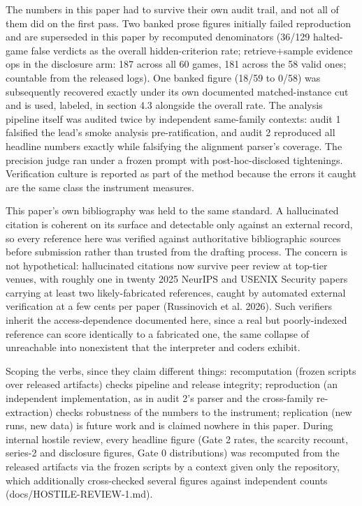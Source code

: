 \documentclass[11pt]{article}
\begin{document}
The numbers in this paper had to survive their own audit trail, and not
all of them did on the first pass. Two banked prose figures initially
failed reproduction and are superseded in this paper by recomputed
denominators (36/129 halted-game false verdicts as the overall
hidden-criterion rate; retrieve+sample evidence ops in the disclosure
arm: 187 across all 60 games, 181 across the 58 valid ones; countable
from the released logs). One banked figure (18/59 to 0/58) was
subsequently recovered exactly under its own documented matched-instance
cut and is used, labeled, in section 4.3 alongside the overall rate. The
analysis pipeline itself was audited twice by independent same-family
contexts: audit 1 falsified the lead's smoke analysis pre-ratification,
and audit 2 reproduced all headline numbers exactly while falsifying the
alignment parser's coverage. The precision judge ran under a frozen
prompt with post-hoc-disclosed tightenings. Verification culture is
reported as part of the method because the errors it caught are the same
class the instrument measures.

This paper's own bibliography was held to the same standard. A
hallucinated citation is coherent on its surface and detectable only
against an external record, so every reference here was verified
against authoritative bibliographic sources before submission rather
than trusted from the drafting process. The concern is not
hypothetical: hallucinated citations now survive peer review at
top-tier venues, with roughly one in twenty 2025 NeurIPS and USENIX
Security papers carrying at least two likely-fabricated references,
caught by automated external verification at a few cents per paper
(Russinovich et al. 2026). Such verifiers inherit the
access-dependence documented here, since a real but poorly-indexed
reference can score identically to a fabricated one, the same collapse
of unreachable into nonexistent that the interpreter and coders
exhibit.

Scoping the verbs, since they claim
different things: recomputation (frozen scripts over released artifacts)
checks pipeline and release integrity; reproduction (an independent
implementation, as in audit 2's parser and the cross-family
re-extraction) checks robustness of the numbers to the instrument;
replication (new runs, new data) is future work and is claimed nowhere
in this paper. During internal hostile review, every headline figure
(Gate 2 rates, the scarcity recount, series-2 and disclosure figures,
Gate 0 distributions) was recomputed from the released artifacts via the
frozen scripts by a context given only the repository, which
additionally cross-checked several figures against independent counts
(docs/HOSTILE-REVIEW-1.md).
\end{document}
